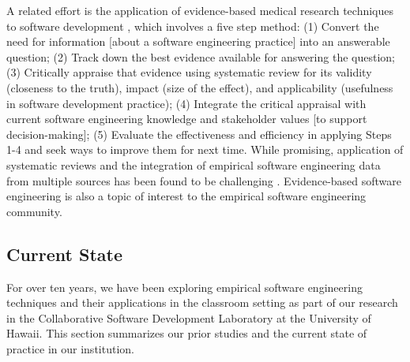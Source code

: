 A related effort is the application of evidence-based medical research
techniques to software development \citep{Kitchenham04,Kitchenham04a},
which involves a five step method: (1) Convert the need for information
[about a software engineering practice] into an answerable question; (2)
Track down the best evidence available for answering the question; (3)
Critically appraise that evidence using systematic review for its validity
(closeness to the truth), impact (size of the effect), and applicability
(usefulness in software development practice); (4) Integrate the critical
appraisal with current software engineering knowledge and stakeholder
values [to support decision-making]; (5) Evaluate the effectiveness and
efficiency in applying Steps 1-4 and seek ways to improve them for next
time.  While promising, application of systematic reviews and the
integration of empirical software engineering data from multiple sources
has been found to be challenging \citep{Jedlitschka04}.  Evidence-based
software engineering is also a topic of interest to the empirical software
engineering community.

\subsection{Current State}
\label{sec:current-state}



For over ten years, we have been exploring empirical software engineering
techniques and their applications in the classroom setting as part of our
research in the Collaborative Software Development Laboratory at the
University of Hawaii.  This section summarizes our prior studies and the
current state of practice in our institution.


